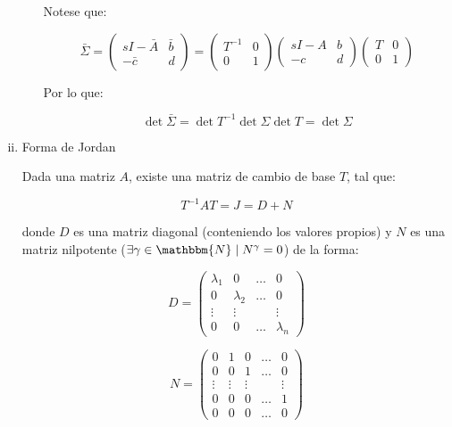 \documentclass[12pt]{article}
\numberwithin{equation}{subsection}
\begin{document}
\begin{enumerate}[i)]
\begin{enumerate}[a)]
Notese que:

\begin{equation}
\bar{\Sigma} =
\begin{pmatrix}
sI - \bar{A} & \bar{b} \\
-\bar{c} & d
\end{pmatrix} =
\begin{pmatrix}
T^{-1} & 0 \\
0 & 1
\end{pmatrix}
\begin{pmatrix}
sI - A & b \\
-c & d
\end{pmatrix}
\begin{pmatrix}
T & 0 \\
0 & 1
\end{pmatrix} \nonumber
\end{equation}

Por lo que:

\begin{equation}
\det{\bar{\Sigma}} = \det{T^{-1}} \det{\Sigma} \det{T} = \det{\Sigma} \nonumber
\end{equation}

\end{enumerate}

\item Forma de Jordan

Dada una matriz $A$, existe una matriz de cambio de base $T$, tal que:

\begin{equation}
T^{-1} A T = J = D + N
\end{equation}

donde $D$ es una matriz diagonal (conteniendo los valores propios) y $N$ es una matriz nilpotente ($\exists \gamma \in \mathbbm{N} \mid N^{\gamma} = 0$) de la forma:

\begin{equation}
D =
\begin{pmatrix}
\lambda_1 & 0 & \dots & 0 \\
0 & \lambda_2 & \dots & 0 \\
\vdots & \vdots & & \vdots \\
0 & 0 & \dots & \lambda_n
\end{pmatrix} \nonumber
\end{equation}

\begin{equation}
N =
\begin{pmatrix}
0 & 1 & 0 & \dots & 0 \\
0 & 0 & 1 & \dots & 0 \\
\vdots & \vdots & \vdots & & \vdots \\
0 & 0 & 0 & \dots & 1 \\
0 & 0 & 0 & \dots & 0
\end{pmatrix} \nonumber
\end{equation}


\end{enumerate}
\end{document}
